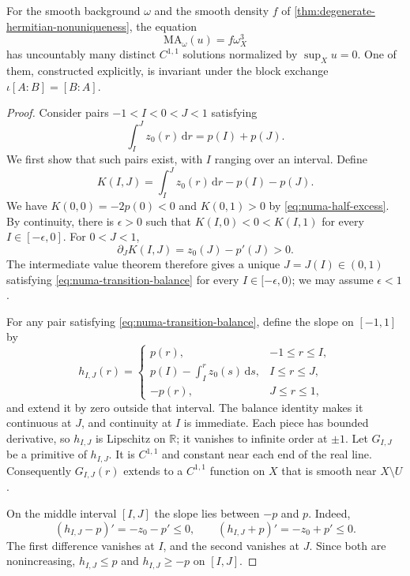 \begin{proposition}\label{prop:numa-radial-continuum}
For the smooth background $\omega$ and the smooth density $f$ of \cref{thm:degenerate-hermitian-nonuniqueness}, the equation
\[
 \mathrm{MA}_\omega(u)=f\omega_X^3
\]
has uncountably many distinct $C^{1,1}$ solutions normalized by $\sup_Xu=0$. One of them, constructed explicitly, is invariant under the block exchange $\iota[A:B]=[B:A]$.
\end{proposition}
\begin{proof}
Consider pairs $-1<I<0<J<1$ satisfying
\begin{equation}\label{eq:numa-transition-balance}
 \int_I^J z_0(r)\,\mathrm{d}r=p(I)+p(J).
\end{equation}
We first show that such pairs exist, with $I$ ranging over an interval. Define
\[
 K(I,J)=\int_I^Jz_0(r)\,\mathrm{d}r-p(I)-p(J).
\]
We have $K(0,0)=-2p(0)<0$ and $K(0,1)>0$ by \eqref{eq:numa-half-excess}. By continuity, there is $\epsilon>0$ such that $K(I,0)<0<K(I,1)$ for every $I\in[-\epsilon,0]$. For $0<J<1$,
\[
 \partial_JK(I,J)=z_0(J)-p'(J)>0.
\]
The intermediate value theorem therefore gives a unique $J=J(I)\in(0,1)$ satisfying \eqref{eq:numa-transition-balance} for every $I\in[-\epsilon,0)$; we may assume $\epsilon<1$.

For any pair satisfying \eqref{eq:numa-transition-balance}, define the slope on $[-1,1]$ by
\[
 h_{I,J}(r)=
 \begin{cases}
 p(r),&-1\leq r\leq I,\\
 p(I)-\displaystyle\int_I^r z_0(s)\,\mathrm{d}s,&I\leq r\leq J,\\
 -p(r),&J\leq r\leq1,
 \end{cases}
\]
and extend it by zero outside that interval. The balance identity makes it continuous at $J$, and continuity at $I$ is immediate. Each piece has bounded derivative, so $h_{I,J}$ is Lipschitz on $\mathbb R$; it vanishes to infinite order at $\pm1$. Let $G_{I,J}$ be a primitive of $h_{I,J}$. It is $C^{1,1}$ and constant near each end of the real line. Consequently $G_{I,J}(r)$ extends to a $C^{1,1}$ function on $X$ that is smooth near $X\setminus U$.

On the middle interval $[I,J]$ the slope lies between $-p$ and $p$. Indeed,
\[
 (h_{I,J}-p)'=-z_0-p'\leq0,
 \qquad
 (h_{I,J}+p)'=-z_0+p'\leq0.
\]
The first difference vanishes at $I$, and the second vanishes at $J$. Since both are nonincreasing, $h_{I,J}\leq p$ and $h_{I,J}\geq-p$ on $[I,J]$.


\end{proof}
